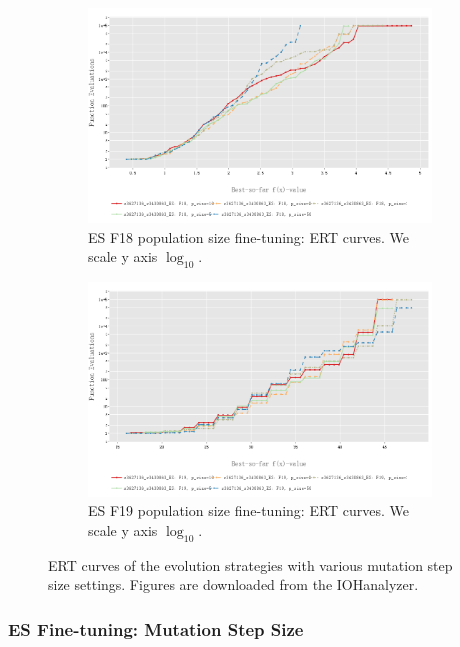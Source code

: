 \documentclass{article}
\begin{document}
\begin{figure}[!ht]
    \begin{subfigure}[h]{0.95\linewidth}
        \includegraphics[width=\linewidth]{es/f18/ERT18ps.png}
        \caption{ES F18 population size fine-tuning: ERT curves. We scale y axis $\log_{10}$.}
    \end{subfigure}
    \hfill
    \begin{subfigure}[h]{0.95\linewidth}
        \includegraphics[width=\linewidth]{es/f19/ERT19ps.png}
        \caption{ES F19 population size fine-tuning: ERT curves. We scale y axis $\log_{10}$.}
    \end{subfigure}
    \caption{ERT curves of the evolution strategies with various mutation step size settings. Figures are downloaded from the IOHanalyzer.}
    \label{fig:experi-es-psize-ert}
\end{figure}

\subsubsection{ES Fine-tuning: Mutation Step Size}
\end{document}
